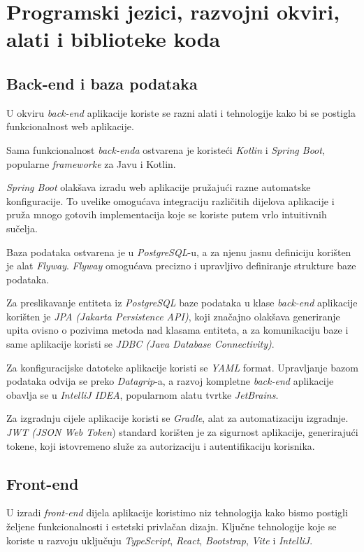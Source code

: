 		
		\section{Programski jezici, razvojni okviri, alati i biblioteke koda}
		
		
		\subsection{Back-end i baza podataka}
		U okviru \textit{back-end} aplikacije koriste se razni alati i tehnologije kako bi se postigla funkcionalnost web aplikacije. 
		
		Sama funkcionalnost \textit{back-enda} ostvarena je koristeći \textit{Kotlin} i \textit{Spring Boot}, popularne \textit{frameworke} za Javu i Kotlin.
		
		\textit{Spring Boot} olakšava izradu web aplikacije pružajući razne automatske konfiguracije. To uvelike omogućava integraciju različitih dijelova aplikacije i pruža mnogo gotovih implementacija koje se koriste putem vrlo intuitivnih sučelja.
		
		Baza podataka ostvarena je u \textit{PostgreSQL}-u, a za njenu jasnu definiciju korišten je alat \textit{Flyway}. \textit{Flyway} omogućava precizno i upravljivo definiranje strukture baze podataka.
		
		Za preslikavanje entiteta iz \textit{PostgreSQL} baze podataka u klase \textit{back-end} aplikacije korišten je \textit{JPA (Jakarta Persistence API)}, koji značajno olakšava generiranje upita ovisno o pozivima metoda nad klasama entiteta, a za komunikaciju baze i same aplikacije koristi se \textit{JDBC (Java Database Connectivity)}.
		
		Za konfiguracijske datoteke aplikacije koristi se \textit{YAML} format. Upravljanje bazom podataka odvija se preko \textit{Datagrip}-a, a razvoj kompletne \textit{back-end} aplikacije obavlja se u \textit{IntelliJ IDEA}, popularnom alatu tvrtke \textit{JetBrains}. 
		
		Za izgradnju cijele aplikacije koristi se \textit{Gradle}, alat za automatizaciju izgradnje. 
\textit{JWT (JSON Web Token}) standard korišten je za sigurnost aplikacije, generirajući tokene, koji istovremeno služe za autorizaciju i autentifikaciju korisnika.


			\subsection{Front-end}
			U izradi \textit{front-end} dijela aplikacije koristimo niz tehnologija kako bismo postigli željene funkcionalnosti i estetski privlačan dizajn. Ključne tehnologije koje se koriste u razvoju uključuju \textit{TypeScript}, \textit{React}, \textit{Bootstrap}, \textit{Vite} i \textit{IntelliJ}.
			
